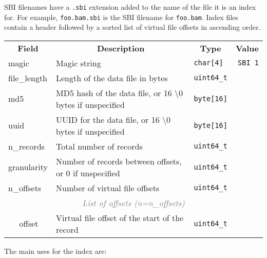 \documentclass[10pt]{article}
\begin{document}
SBI filenames have a {\tt .sbi} extension added to the name of the file it is
an index for. For example, {\tt foo.bam.sbi} is the SBI filename for
{\tt foo.bam}. Index files contain a header followed by a sorted list of
virtual file offsets in ascending order.

\begin{table}[ht]
\centering
{\small
\begin{tabular}{|l|l|l|p{8.15cm}|l|r|}
  \cline{1-6}
  \multicolumn{3}{|c|}{\bf Field} & \multicolumn{1}{c|}{\bf Description} & \multicolumn{1}{c|}{\bf Type} & \multicolumn{1}{c|}{\bf Value} \\\cline{1-6}
  \multicolumn{3}{|l|}{\sf magic} & Magic string & {\tt char[4]} & {\tt SBI\char92 1}\\\cline{1-6}
  \multicolumn{3}{|l|}{\sf file\_length} & Length of the data file in bytes & {\tt uint64\_t} & \\\cline{1-6}
  \multicolumn{3}{|l|}{\sf md5} & MD5 hash of the data file, or 16 \textbackslash0 bytes if unspecified & {\tt byte[16]} & \\\cline{1-6}
  \multicolumn{3}{|l|}{\sf uuid} & UUID for the data file, or 16 \textbackslash0 bytes if unspecified & {\tt byte[16]} & \\\cline{1-6}
  \multicolumn{3}{|l|}{\sf n\_records} & Total number of records & {\tt uint64\_t} & \\\cline{1-6}
  \multicolumn{3}{|l|}{\sf granularity} & Number of records between offsets, or 0 if unspecified & {\tt uint64\_t} & \\\cline{1-6}
  \multicolumn{3}{|l|}{\sf n\_offsets} & Number of virtual file offsets & {\tt uint64\_t} & \\\cline{1-6}
  \multicolumn{6}{|c|}{\textcolor{gray}{\it List of offsets (n=n\_offsets)}} \\\cline{2-6}
  & \multicolumn{2}{l|}{\sf offset} & Virtual file offset of the start of the record & {\tt uint64\_t} & \\\cline{1-6}
\end{tabular}}
\end{table}

The main uses for the index are:
\end{document}
